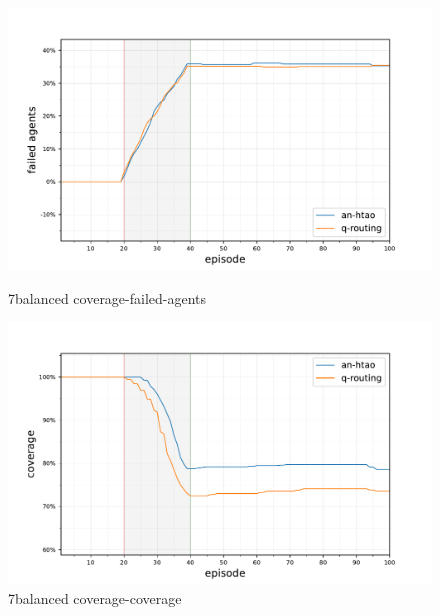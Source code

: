 \begin{figure}[ht]
	\begin{minipage}{.49\textwidth}
		\centering
		\includegraphics[width=1.0\linewidth,trim={25pt 0pt 50pt 0pt},clip]{7balanced_coverage-failed-agents}
		\captionsetup{labelfont=bf,singlelinecheck=on}
		\caption{7balanced coverage-failed-agents}
		\label{fig:7balanced_coverage-failed-agents}
	\end{minipage}
	\begin{minipage}{.49\textwidth}
		\centering
		\includegraphics[width=1.0\linewidth,trim={25pt 0pt 50pt 0pt},clip]{7balanced_coverage-coverage}
		\captionsetup{labelfont=bf,singlelinecheck=on}
		\caption{7balanced coverage-coverage}
		\label{fig:7balanced_coverage-coverage}
	\end{minipage}\hfill%
\end{figure}

